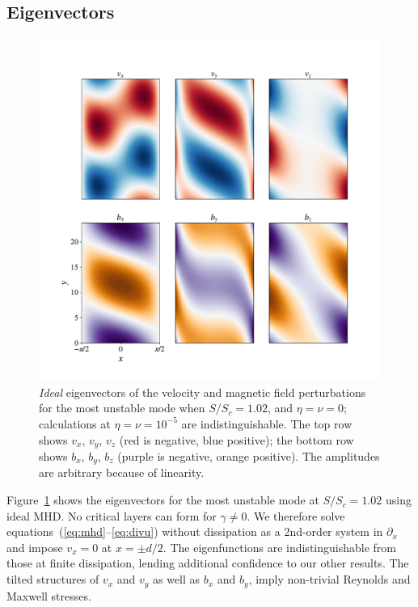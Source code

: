 \documentclass[openacc]{rsproca_new}%
\newcommand{\SSC}{S/S_{c}}
\begin{document}
\subsection{Eigenvectors}
\label{sec:eigenvectors}

\begin{figure}[h!]
  \centering
  \includegraphics[width=\columnwidth]{eigvecs_xy_run_11_ideal_single_mode.pdf}
  \caption{\textit{Ideal} eigenvectors of the velocity and magnetic field perturbations for the most unstable mode when $\SSC=1.02$, and $\eta=\nu=0$; calculations at $\eta=\nu=10^{-5}$ are indistinguishable.
  The top row shows $v_{x}$, $v_{y}$, $v_{z}$ (red is negative, blue positive); the bottom row shows $b_{x}$, $b_{y}$, $b_{z}$ (purple is negative, orange positive). 
The amplitudes are arbitrary because of linearity.}
  \label{fig:eigvec}
\end{figure}

Figure~\ref{fig:eigvec} shows the eigenvectors for the most unstable mode at $\SSC=1.02$ using ideal MHD. 
No critical layers can form for $\gamma\ne0$.
We therefore solve equations~(\ref{eq:mhd}--\ref{eq:divu}) without dissipation as a 2nd-order system in $\partial_{x}$ and impose $v_{x}=0$ at $x=\pm{d/2}$.
The eigenfunctions are indistinguishable from those at finite dissipation, lending additional confidence to our other results.
The tilted structures of $v_{x}$ and $v_{y}$ as well as $b_{x}$ and $b_{y}$, imply non-trivial Reynolds and Maxwell stresses.
\end{document}
